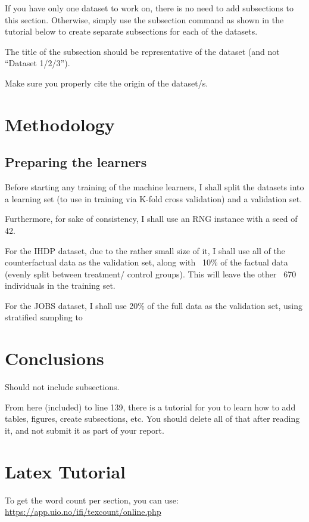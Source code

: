 \documentclass{article}
\begin{document}
If you have only one dataset to work on, there is no need to add subsections to this section.
Otherwise, simply use the subsection command as shown in the tutorial below to create
separate subsections for each of the datasets.

The title of the subsection should be representative of the dataset (and not ``Dataset 1/2/3'').

Make sure you properly cite the origin of the dataset/s.

\section{Methodology}

\subsection{Preparing the learners}

Before starting any training of the machine learners, I shall split the datasets into a learning
set (to use in training via K-fold cross validation) and a validation set.

Furthermore, for sake of consistency, I shall use an RNG instance with a seed of 42.

For the IHDP dataset, due to the rather small size of it, I shall use all of the counterfactual
data as the validation set, along with ~10\% of the factual data (evenly split between treatment/
control groups). This will leave the other ~670 individuals in the training set.

For the JOBS dataset, I shall use 20\% of the full data as the validation set, using stratified
sampling to 

\section{Conclusions}

Should not include subsections.

From here (included) to line 139, there is a tutorial for you to learn how to add tables,
figures, create subsections, etc.
You should delete all of that after reading it, and not submit it as part of your report.

\section{Latex Tutorial}
\label{sec:tutorial}

To get the word count per section, you can use: \url{https://app.uio.no/ifi/texcount/online.php}
\end{document}
